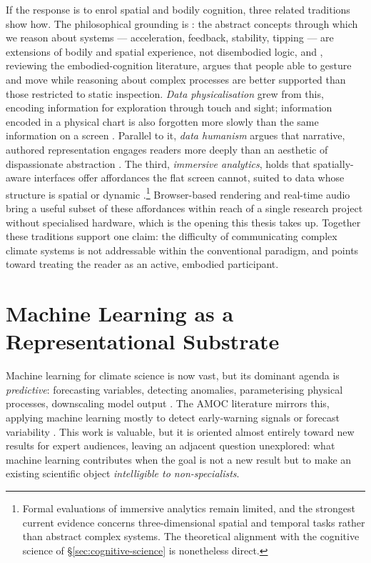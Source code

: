 If the response is to enrol spatial and bodily cognition, three related traditions show how. The philosophical grounding is \citet{lakoff1999}: the abstract concepts through which we reason about systems --- acceleration, feedback, stability, tipping --- are extensions of bodily and spatial experience, not disembodied logic, and \citet{kirsh2013}, reviewing the embodied-cognition literature, argues that people able to gesture and move while reasoning about complex processes are better supported than those restricted to static inspection. \emph{Data physicalisation} \citep{jansen2015} grew from this, encoding information for exploration through touch and sight; information encoded in a physical chart is also forgotten more slowly than the same information on a screen \parencite{stusak2015}. Parallel to it, \emph{data humanism} argues that narrative, authored representation engages readers more deeply than an aesthetic of dispassionate abstraction \citep{lupi2017, segel2010}. The third, \emph{immersive analytics}, holds that spatially-aware interfaces offer affordances the flat screen cannot, suited to data whose structure is spatial or dynamic \citep{marriott2018}.\footnote{Formal evaluations of immersive analytics remain limited, and the strongest current evidence concerns three-dimensional spatial and temporal tasks rather than abstract complex systems. The theoretical alignment with the cognitive science of \S\ref{sec:cognitive-science} is nonetheless direct.} Browser-based rendering and real-time audio bring a useful subset of these affordances within reach of a single research project without specialised hardware, which is the opening this thesis takes up. Together these traditions support one claim: the difficulty of communicating complex climate systems is not addressable within the conventional paradigm, and points toward treating the reader as an active, embodied participant.

\section{Machine Learning as a Representational Substrate}
\label{sec:ml-climate}

Machine learning for climate science is now vast, but its dominant agenda is \emph{predictive}: forecasting variables, detecting anomalies, parameterising physical processes, downscaling model output \citep{reichstein2019, sonnewald2021}. The AMOC literature mirrors this, applying machine learning mostly to detect early-warning signals or forecast variability \citep{boers2021, ditlevsen2023}. This work is valuable, but it is oriented almost entirely toward new results for expert audiences, leaving an adjacent question unexplored: what machine learning contributes when the goal is not a new result but to make an existing scientific object \emph{intelligible to non-specialists}.

